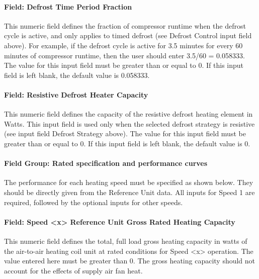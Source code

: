 \paragraph{Field: Defrost Time Period Fraction}\label{field-defrost-time-period-fraction-2}

This numeric field defines the fraction of compressor runtime when the defrost cycle is active, and only applies to timed defrost (see Defrost Control input field above). For example, if the defrost cycle is active for 3.5 minutes for every 60 minutes of compressor runtime, then the user should enter 3.5/60 = 0.058333. The value for this input field must be greater than or equal to 0. If this input field is left blank, the default value is 0.058333.

\paragraph{Field: Resistive Defrost Heater Capacity}\label{field-resistive-defrost-heater-capacity-2}

This numeric field defines the capacity of the resistive defrost heating element in Watts. This input field is used only when the selected defrost strategy is resistive (see input field Defrost Strategy above). The value for this input field must be greater than or equal to 0. If this input field is left blank, the default value is 0.

\paragraph{Field Group: Rated specification and performance curves}\label{field-group-rated-specification-and-performance-curves}

The performance for each heating speed must be specified as shown below. They should be directly given from the Reference Unit data. All inputs for Speed 1 are required, followed by the optional inputs for other speeds.

\paragraph{Field: Speed \textless{}x\textgreater{} Reference Unit Gross Rated Heating Capacity}\label{field-speed-x-reference-unit-gross-rated-heating-capacity}

This numeric field defines the total, full load gross heating capacity in watts of the air-to-air heating coil unit at rated conditions for Speed \textless{}x\textgreater{} operation. The value entered here must be greater than 0. The gross heating capacity should not account for the effects of supply air fan heat.

